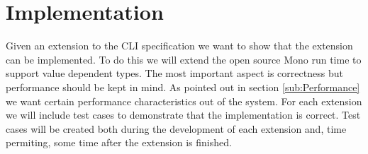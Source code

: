 \section{Implementation}

Given an extension to the CLI specification we want to show that the
extension can be implemented. To do this we will extend the open source
Mono run time to support value dependent types. The most important
aspect is correctness but performance should be kept in mind. As pointed
out in section \ref{sub:Performance} we want certain performance
characteristics out of the system. For each extension we will include
test cases to demonstrate that the implementation is correct. Test
cases will be created both during the development of each extension
and, time permiting, some time after the extension is finished.